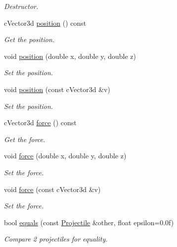 \begin{DoxyCompactItemize}
\begin{DoxyCompactList}\small\item\em Destructor. \item\end{DoxyCompactList}\item 
cVector3d \hyperlink{classProjectile_a365ac17f48bff5a1a29b20f7810db86b}{position} () const 
\begin{DoxyCompactList}\small\item\em Get the position. \item\end{DoxyCompactList}\item 
void \hyperlink{classProjectile_a8216e973c892e18a1ace6f3385b6264c}{position} (double x, double y, double z)
\begin{DoxyCompactList}\small\item\em Set the position. \item\end{DoxyCompactList}\item 
void \hyperlink{classProjectile_a1bcec53ee3a1f27424a9d2aaef660014}{position} (const cVector3d \&v)
\begin{DoxyCompactList}\small\item\em Set the position. \item\end{DoxyCompactList}\item 
cVector3d \hyperlink{classProjectile_a710fc08eff87beb2984937c52dd180a8}{force} () const 
\begin{DoxyCompactList}\small\item\em Get the force. \item\end{DoxyCompactList}\item 
void \hyperlink{classProjectile_a32d86dffbc2aa5621a62479e0a1ed68d}{force} (double x, double y, double z)
\begin{DoxyCompactList}\small\item\em Set the force. \item\end{DoxyCompactList}\item 
void \hyperlink{classProjectile_a87d54cff36cc5f6e1fe92811476079fd}{force} (const cVector3d \&v)
\begin{DoxyCompactList}\small\item\em Set the force. \item\end{DoxyCompactList}\item 
bool \hyperlink{classProjectile_abb98fb2ad23ddeb32102d7d3b924878c}{equals} (const \hyperlink{classProjectile}{Projectile} \&other, float epsilon=0.0f)
\begin{DoxyCompactList}\small\item\em Compare 2 projectiles for equality. \item\end{DoxyCompactList}\end{DoxyCompactItemize}
